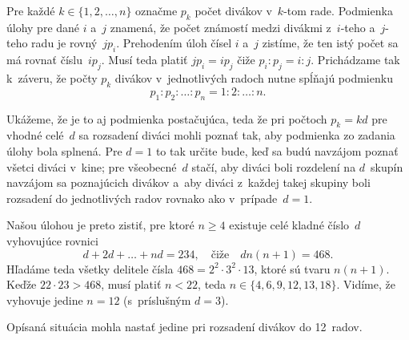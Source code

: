 {%
Pre každé $k\in\{1,2,\dots,n\}$ označme $p_k$ počet divákov
v~$k$-tom rade. Podmienka úlohy pre dané $i$ a~$j$ znamená, že počet
známostí medzi divákmi z~$i$-teho a~$j$-teho radu je rovný~$jp_i$.
Prehodením úloh čísel $i$ a~$j$ zistíme, že ten istý
počet sa má rovnať číslu~$ip_j$. Musí teda platiť
$jp_i =ip_j$ čiže $p_i:p_j=i:j$. Prichádzame tak
k~záveru, že počty $p_k$ divákov v~jednotlivých radoch nutne spĺňajú
podmienku
$$
p_1:p_2:\dots:p_n=1:2:\dots:n.
$$

Ukážeme, že je to aj podmienka postačujúca, teda že pri počtoch
$p_k=kd$ pre vhodné celé~$d$ sa rozsadení diváci mohli poznať tak,
aby podmienka zo zadania úlohy bola splnená. Pre $d=1$ to tak
určite bude, keď sa budú navzájom poznať všetci diváci v~kine;
pre všeobecné~$d$ stačí, aby diváci boli rozdelení na $d$~skupín
navzájom sa poznajúcich divákov a~aby diváci z~každej takej
skupiny boli rozsadení do jednotlivých radov rovnako ako v~prípade~$d=1$.

Našou úlohou je preto zistiť, pre ktoré $n\ge4$ existuje celé
kladné číslo~$d$ vyhovujúce rovnici
$$
d+2d+\dots+nd=234,\quad\text{čiže}\quad dn(n+1)=468.
$$
Hľadáme teda všetky delitele čísla $468=2^2\cdot3^2\cdot13$, ktoré
sú tvaru $n(n+1)$. Keďže $22\cdot23>468$, musí platiť $n<22$,
teda $n\in\{4,6,9,12,13,18\}$. Vidíme, že vyhovuje jedine $n=12$
(s~príslušným $d=3$).

\odpoved
Opísaná situácia mohla nastať jedine pri rozsadení
divákov do 12~radov.
}

